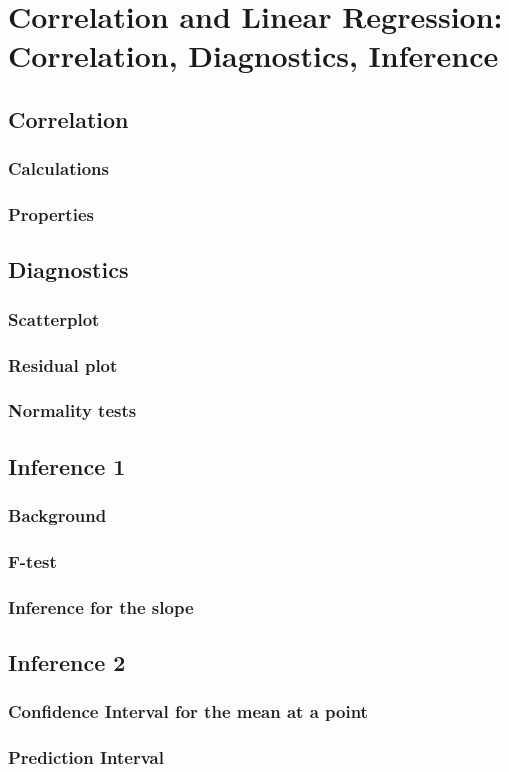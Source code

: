 \chapter{Correlation and Linear Regression: Correlation, Diagnostics, Inference}  %

\section{Correlation}  %
    \subsection{Calculations}  %
    \subsection{Properties}  %

\section{Diagnostics}  %
    \subsection{Scatterplot}  %
    \subsection{Residual plot}  %
    \subsection{Normality tests}  %

\section{Inference 1}  %
    \subsection{Background}  %
    \subsection{F-test}  %
    \subsection{Inference for the slope}  %

\section{Inference 2}  %
    \subsection{Confidence Interval for the mean at a point}  %
    \subsection{Prediction Interval}  %
